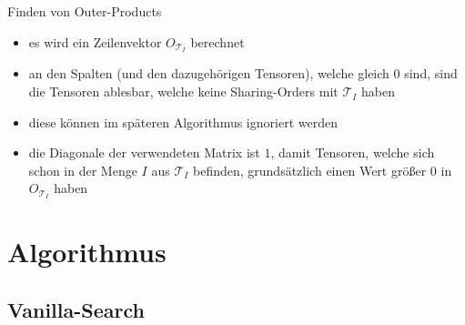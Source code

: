 \documentclass{beamer}
\newcommand{\Tau}{\bm{\mathcal{T}}}
\begin{document}
\begin{frame}{Finden von Outer-Products}
	\begin{itemize}
		\item es wird ein Zeilenvektor $O_{\Tau_I}$ berechnet
		\item an den Spalten (und den dazugehörigen Tensoren), welche gleich $0$ sind, sind die Tensoren ablesbar, welche keine Sharing-Orders mit $\Tau_I$ haben
		\item diese können im späteren Algorithmus ignoriert werden \pause
		\item die Diagonale der verwendeten Matrix ist $1$, damit Tensoren, welche sich schon in der Menge $I$ aus $\Tau_I$ befinden, grundsätzlich einen Wert größer $0$ in $O_{\Tau_I}$ haben
	\end{itemize}
\end{frame}



\section{Algorithmus}



\subsection{Vanilla-Search}
\end{document}
